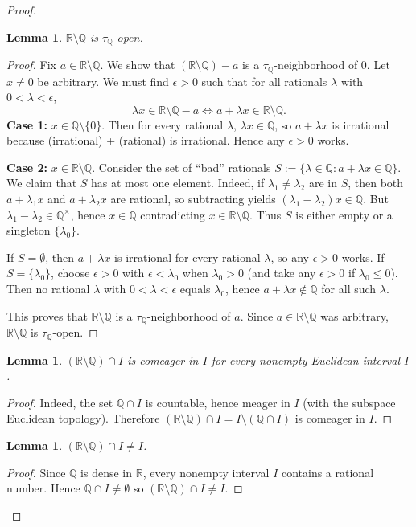 \documentclass[11pt]{amsart} %
\newtheorem{lemma}[theorem]{Lemma}
\theoremstyle{definition}
\newcommand{\Q}{\mathbb{Q}}
\begin{document}
\begin{proof}
\begin{lemma} $\mathbb{R}\setminus\mathbb{Q}$ is $\tau_{\Q}$-open. 
\end{lemma} 
\begin{proof} 
Fix $a\in\mathbb{R}\setminus\mathbb{Q}$. We show that $(\mathbb{R}\setminus\mathbb{Q})-a$ is a $\tau_{\Q}$-neighborhood of $0$. Let $x\ne0$ be arbitrary. We must find $\epsilon>0$ such that for all rationals $\lambda$ with $0<\lambda<\epsilon$,
\begin{equation} 
\lambda x\in\mathbb{R}\setminus\mathbb{Q}-a\iff a+\lambda x\in\mathbb{R}\setminus\mathbb{Q}. 
\end{equation} 
\noindent \textbf{Case 1:} $x\in\mathbb{Q}\setminus\{0\}$. Then for every rational $\lambda$, $\lambda x\in\mathbb{Q}$, so $a+\lambda x$ is irrational because (irrational) + (rational) is irrational. Hence any $\epsilon>0$ works.

\noindent \textbf{Case 2:} $x\in\mathbb{R}\setminus\mathbb{Q}$. Consider the set of ``bad'' rationals $S:=\{\lambda\in\mathbb{Q}:a+\lambda x\in\mathbb{Q}\}.$ 
We claim that $S$ has at most one element. Indeed, if $\lambda_{1}\ne\lambda_{2}$ are in $S$, then both $a+\lambda_{1}x$ and $a+\lambda_{2}x$ are rational, so subtracting yields $(\lambda_{1}-\lambda_{2})x\in\mathbb{Q}.$ 
But $\lambda_{1}-\lambda_{2}\in\mathbb{Q}^{\times}$, hence $x\in\mathbb{Q}$ contradicting $x\in\mathbb{R}\setminus\mathbb{Q}$. Thus $S$ is either empty or a singleton $\{\lambda_{0}\}$.

If $S=\emptyset$, then $a+\lambda x$ is irrational for every rational $\lambda$, so any $\epsilon>0$ works. If $S=\{\lambda_{0}\}$, choose $\epsilon>0$ with $\epsilon<\lambda_{0}$ when $\lambda_{0}>0$ (and take any $\epsilon>0$ if $\lambda_{0}\le0$). Then no rational $\lambda$ with $0<\lambda<\epsilon$ equals $\lambda_{0}$, hence $a+\lambda x\notin\mathbb{Q}$ for all such $\lambda$.

This proves that $\mathbb{R}\setminus\mathbb{Q}$ is a $\tau_{\Q}$-neighborhood of $a$. Since $a\in\mathbb{R}\setminus\mathbb{Q}$ was arbitrary, $\mathbb{R}\setminus\mathbb{Q}$ is $\tau_{\Q}$-open.
\end{proof} 
\begin{lemma} 
$(\mathbb{R}\setminus\mathbb{Q})\cap I$ is comeager in $I$ for every nonempty Euclidean interval $I$. 
\end{lemma} 
\begin{proof} 

Indeed, the set $\mathbb{Q}\cap I$ is countable, hence meager in $I$ (with the subspace Euclidean topology). Therefore $(\mathbb{R}\setminus\mathbb{Q})\cap I=I\setminus(\mathbb{Q}\cap I)$ is comeager in $I$.
\end{proof} 
\begin{lemma} 
$(\mathbb{R}\setminus\mathbb{Q})\cap I\ne I$. 
\end{lemma} 
\begin{proof} 
Since $\mathbb{Q}$ is dense in $\mathbb{R}$, every nonempty interval $I$ contains a rational number. Hence $\mathbb{Q}\cap I\ne\emptyset$ so $(\mathbb{R}\setminus\mathbb{Q})\cap I\ne I$.
\end{proof} 
\end{proof}
\end{document}
